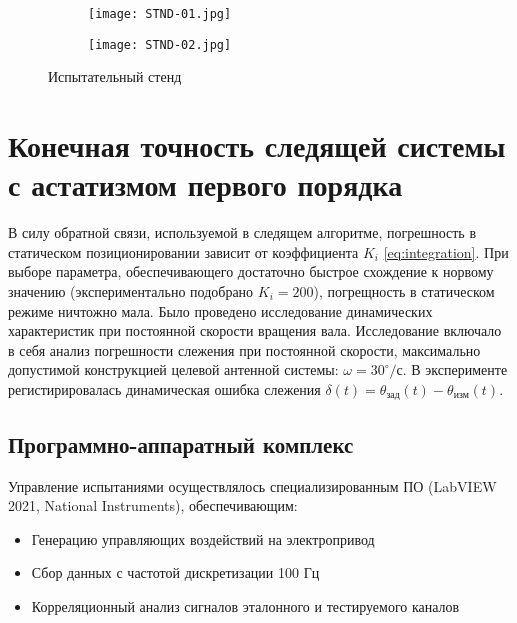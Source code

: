 \begin{figure}[!h]
  \centering
  \begin{subfigure}[b]{0.48\textwidth}
    \centering
    \texttt{[image: STND-01.jpg]} 
    \label{STND01}
  \end{subfigure}
  \hfill
  \begin{subfigure}[b]{0.48\textwidth}
    \centering
    \texttt{[image: STND-02.jpg]} 
    \label{STND02}
  \end{subfigure}

  \caption{Испытательный стенд}
  \label{STND-ISP} 
\end{figure}

\FloatBarrier

\section{Конечная точность следящей системы с астатизмом первого порядка}

В силу обратной связи, используемой в следящем алгоритме, погрешность в статическом позиционировании зависит от 
коэффициента $K_i$ \ref{eq:integration}. При выборе параметра, обеспечивающего достаточно быстрое схождение к норвому значению 
(экспериментально подобрано $K_i = 200$), погрещность в статическом режиме ничтожно мала. Было проведено исследование динамических характеристик 
при постоянной скорости вращения вала. Исследование включало в себя анализ погрешности слежения при постоянной скорости, максимально допустимой конструкцией
целевой антенной системы: $\omega = 30^\circ/\text{с}$. В эксперименте регистирировалась динамическая ошибка слежения 
$\delta(t) = \theta_{\text{зад}}(t) - \theta_{\text{изм}}(t)$.

\subsection{Программно-аппаратный комплекс}
Управление испытаниями осуществлялось специализированным ПО  \newline (LabVIEW 2021, National Instruments), обеспечивающим:
\begin{itemize}
    \item Генерацию управляющих воздействий на электропривод
    \item Сбор данных с частотой дискретизации 100 Гц
    \item Корреляционный анализ сигналов эталонного и тестируемого каналов
\end{itemize}



